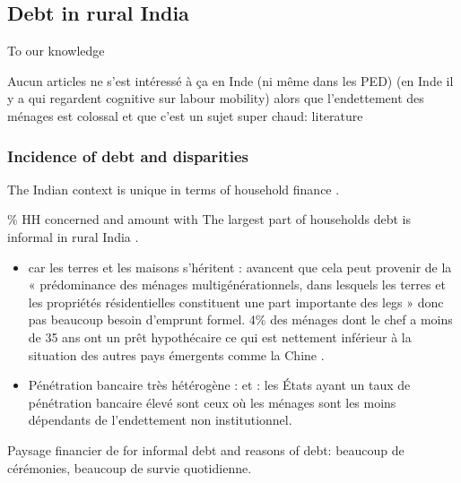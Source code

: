 \documentclass[a4paper, 11pt, onecolumn]{article}
\begin{document}
\subsection{Debt in rural India}

To our knowledge

Aucun articles ne s’est intéressé à ça en Inde (ni même dans les PED) (en Inde il y a \citep{Michiels2021} qui regardent cognitive sur labour mobility) alors que l’endettement des ménages est colossal et que c’est un sujet super chaud: literature		

	\subsubsection{Incidence of debt and disparities}

The Indian context is unique in terms of household finance \citep{Badarinza2016b}.

\% HH concerned and amount with \cite{NSSO2014}
The largest part of households debt is informal in rural India \citep{Badarinza2016b}.
\begin{itemize}
\item car les terres et les maisons s'héritent : \citep{Badarinza2016b} avancent que cela peut provenir de la « prédominance des ménages multigénérationnels, dans lesquels les terres et les propriétés résidentielles constituent une part importante des legs » donc pas beaucoup besoin d'emprunt formel. 4\% des ménages dont le chef a moins de 35 ans ont un prêt hypothécaire ce qui est nettement inférieur à la situation des autres pays émergents comme la Chine \citep{Badarinza2016b}.
\item Pénétration bancaire très hétérogène : \citep{Badarinza2016b} et \citep{Burgess2005} : les États ayant un taux de pénétration bancaire élevé sont ceux où les ménages sont les moins dépendants de l’endettement non institutionnel.
\end{itemize}

Paysage financier de \cite{Guerin2012a} for informal debt and reasons of debt: beaucoup de cérémonies, beaucoup de survie quotidienne.
\end{document}
